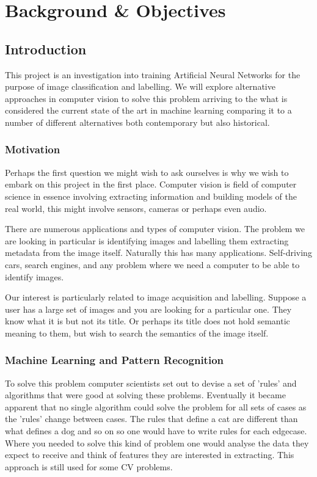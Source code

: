 \chapter{Background \& Objectives}

\section{Introduction}
This project is an investigation into training Artificial Neural Networks for the purpose of image classification and labelling. We will explore alternative approaches in computer vision to solve this problem arriving to the what is considered the current state of the art in machine learning comparing it to a number of different alternatives both contemporary but also historical.

\subsection{Motivation}
Perhaps the first question we might wish to ask ourselves is why we wish to embark on this project in the first place. Computer vision is field of computer science in essence involving extracting information and building models of the real world, this might involve sensors, cameras or perhaps even audio.

There are numerous applications and types of computer vision. The problem we are looking in particular is identifying images and labelling them extracting metadata from the image itself. Naturally this has many applications. Self-driving cars, search engines, and any problem where we need a computer to be able to identify images.

Our interest is particularly related to image acquisition and labelling. Suppose a user has a large set of images and you are looking for a particular one. They know what it is but not its title. Or perhaps its title does not hold semantic meaning to them, but wish to search the semantics of the image itself.

\subsection{Machine Learning and Pattern Recognition}
To solve this problem computer scientists set out to devise a set of 'rules' and algorithms that were good at solving these problems. Eventually it became apparent that no single algorithm could solve the problem for all sets of cases as the 'rules' change between cases. The rules that define a cat are different than what defines a dog and so on so one would have to write rules for each edgecase. Where you needed to solve this kind of problem one would analyse the data they expect to receive and think of features they are interested in extracting. This approach is still used for some CV problems.

